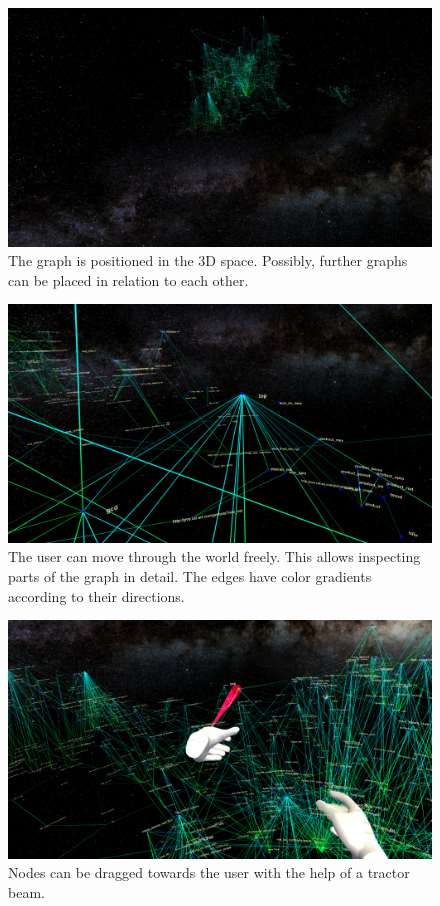 \documentclass{llncs}
\begin{document}
\begin{figure}
    \centering
    \includegraphics[width=1\textwidth ]{galaxyfaraway}
    \caption{The graph is positioned in the 3D space. Possibly, further graphs can be placed in relation to each other.}
    \label{fig:sample_figure1}
\end{figure}

\begin{figure}
    \centering
    \includegraphics[width=1\textwidth ]{part}
    \caption{The user can move through the world freely. This allows inspecting parts of the graph in detail. The edges have color gradients according to their directions.}
    \label{fig:sample_figure2}
\end{figure}


\begin{figure}
    \centering
    \includegraphics[width=1\textwidth ]{tractor}
    \caption{Nodes can be dragged towards the user with the help of a tractor beam.}
    \label{fig:sample_figure3}
\end{figure}
\end{document}

